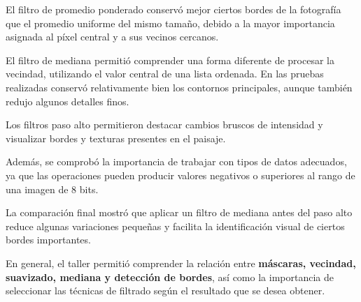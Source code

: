 \documentclass[11pt,letterpaper]{article}
\begin{document}
El filtro de promedio ponderado
conservó mejor ciertos bordes
de la fotografía que el promedio uniforme
del mismo tamaño, debido a la mayor
importancia asignada al píxel central
y a sus vecinos cercanos.

El filtro de mediana permitió comprender
una forma diferente de procesar
la vecindad, utilizando el valor central
de una lista ordenada.
En las pruebas realizadas conservó
relativamente bien los contornos principales,
aunque también redujo algunos detalles finos.

Los filtros paso alto permitieron destacar
cambios bruscos de intensidad y visualizar
bordes y texturas presentes en el paisaje.

Además, se comprobó la importancia
de trabajar con tipos de datos adecuados,
ya que las operaciones pueden producir
valores negativos o superiores
al rango de una imagen de 8 bits.

La comparación final mostró que aplicar
un filtro de mediana antes del paso alto
reduce algunas variaciones pequeñas
y facilita la identificación visual
de ciertos bordes importantes.

En general, el taller permitió comprender
la relación entre
\textbf{máscaras, vecindad, suavizado,
mediana y detección de bordes},
así como la importancia de seleccionar
las técnicas de filtrado según
el resultado que se desea obtener.
\end{document}
